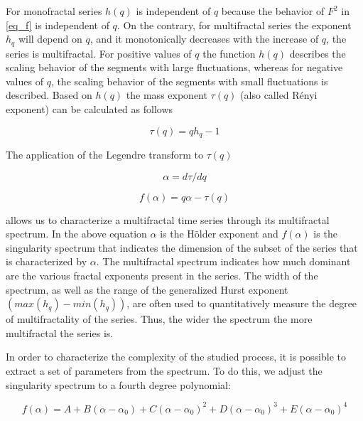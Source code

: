 \documentclass[onecolumn, preprint,aps,amsmath, amssymb, superscriptaddress]{revtex4}
\begin{document}
For monofractal series $h(q)$ is independent of $q$ because the behavior of $F^2$ in \ref{eq_f} is independent of $q$. On the contrary, for multifractal series the exponent $h_q$ will depend on $q$, and it monotonically decreases with the increase of $q$, the series is multifractal. For positive values of $q$ the function $h(q)$ describes the scaling behavior of the segments with large fluctuations, whereas for negative values of $q$, the scaling behavior of the segments with small fluctuations is described. Based on $h(q)$ the mass exponent $\tau(q)$ (also called R\'enyi exponent) can be calculated as follows

\begin{equation}
\tau(q)=qh_q-1
\label{eq:Reny}
\end{equation}

The application of the Legendre transform to $\tau(q)$ 

\begin{equation}
\alpha=d\tau/dq
\end{equation}

\begin{equation}
f(\alpha)=q\alpha-\tau(q)
\end{equation}

allows us to characterize a multifractal time series through its multifractal spectrum. In the above equation $\alpha$ is the H\"older exponent and $f(\alpha)$ is the singularity spectrum that indicates the dimension of the subset of the series that is characterized by $\alpha$. The multifractal spectrum indicates how much dominant are the various fractal exponents present in the series. The width of the spectrum, as well as the range of the generalized Hurst exponent $(max(h_q)-min (h_q))$, are often used to quantitatively measure the degree of multifractality of the series. Thus, the wider the spectrum the more multifractal the series is.

In order to characterize the complexity of the studied process, it is possible to extract a set of parameters from the spectrum. To do this, we adjust the singularity spectrum to a fourth degree polynomial:

\begin{equation}
f(\alpha) =  A + B(\alpha - \alpha_0) + C(\alpha - \alpha_0)^2 + D(\alpha - \alpha_0)^3 + E(\alpha - \alpha_0)^4
\end{equation}
\end{document}
